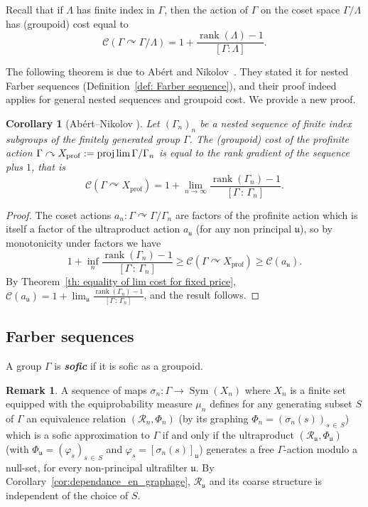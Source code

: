 \documentclass[10pt]{amsart}
\newtheorem{coro}[cdrthm]{Corollary}
\theoremstyle{definition}
\newtheorem{rema}[cdrthm]{Remark}
\newcommand{\defin}[1]{\textbf{\emph{#1}}}
\newcommand{\acting}{\curvearrowright}
\newcommand{\RR}{\mathcal{R}}
\newcommand{\cost}{\mathcal{C}}
\DeclareMathOperator{\Sym}{Sym}
\DeclareMathOperator{\rank}{rank}
\DeclareMathOperator{\prof}{prof}
\newcommand{\ul}{\mathfrak{u}}
\newcommand{\ph}{\varphi}
\begin{document}
Recall that if $\Lambda$ has finite index in $\Gamma$, then the action of $\Gamma$ on the coset space $\Gamma/\Lambda$ has (groupoid) cost equal to
\begin{equation}
\cost(\Gamma\acting \Gamma/\Lambda)=1+\frac{\rank(\Lambda)-1}{[\Gamma:\Lambda]}.
\end{equation}



The following theorem is due to Abért and Nikolov~\cite{Abert-Nikolov-12}. They stated it for nested Farber sequences (Definition~\ref{def: Farber sequence}), and their proof indeed applies for general nested sequences and groupoid cost. We provide a new proof.
\begin{coro}[Abért--Nikolov {\cite[Theorem~1]{Abert-Nikolov-12}}]\label{cor: Abert-Nikolov}
Let $(\Gamma_n)_n$ be a nested sequence of finite index subgroups of the finitely generated group $\Gamma$. The (groupoid) cost of the profinite action $\Gamma\acting X_{\prof}:=\projlim \Gamma/\Gamma_n$ is equal to the rank gradient of the sequence plus $1$, that is
\[
\cost\left(\Gamma\acting X_{\prof}\right)=1+\lim\limits_{n\to \infty}\frac{\rank(\Gamma_n)-1}{[\Gamma\,:\,\Gamma_n]}.
\]
\end{coro}
\begin{proof}
The coset actions $a_n:\Gamma\acting \Gamma/\Gamma_n$ are factors of the profinite action which is itself a factor of the ultraproduct action $a_\ul$ (for any non principal $\ul$), so by monotonicity under factors we have
\[
1+\inf_n \frac{\rank(\Gamma_n)-1}{[\Gamma\,:\,\Gamma_n]}\geq
\cost\left(\Gamma\acting X_{\prof}\right)\geq \cost(a_{\ul}).
\]
By Theorem~\ref{th: equality of lim cost for fixed price}, $\cost(a_{\ul})=1+\lim_\ul\tfrac{\rank(\Gamma_n)-1}{[\Gamma\,:\,\Gamma_n]}$, and the result follows.
\end{proof}



\subsection{Farber sequences}\label{sect: Farber sequences}

A group $\Gamma$ is
\defin{sofic} if it is sofic as a groupoid.

\begin{rema}\label{rem:soficity and freeness of ultralimit action}
A sequence of maps $\sigma_n:\Gamma\to \Sym (X_n)$ where $X_n$ is a finite set equipped with the equiprobability measure $\mu_n$ defines for any generating subset $S$ of $\Gamma$ an equivalence relation $(\RR_n, \Phi_n)$ (by its graphing $\Phi_n=(\sigma_n(s))_{s\,\in\,S}$) which is a sofic approximation to $\Gamma$ if and only if the ultraproduct $(\RR_\ul, \Phi_\ul)$ (with $\Phi_\ul=(\ph_s)_{s\,\in\,S}$ and $\ph_s=[\sigma_n(s)]_\ul$) generates a free $\Gamma$-action modulo a null-set, for every non-principal ultrafilter $\ul$. By Corollary~\ref{cor:dependance_en_graphage}, $\RR_\ul$ and its coarse structure is independent of the choice of $S$.
\end{rema}
\end{document}
